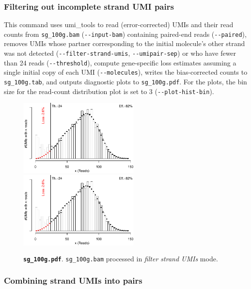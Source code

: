 \documentclass[10pt]{article}
\newcommand{\ddarg}[1]{\texttt{-{}-#1}}
\begin{document}
\subsubsection*{Filtering out incomplete strand UMI pairs}


This command uses umi\_tools to read (error-corrected) UMIs and their read counts from \texttt{sg\_100g.bam} (\ddarg{input-bam}) containing paired-end reads (\ddarg{paired}), removes UMIs whose partner corresponding to the initial molecule's other strand was not detected (\ddarg{filter-strand-umis}, \ddarg{umipair-sep}) or who have fewer than 24 reads (\ddarg{threshold}), compute gene-specific loss estimates assuming a single initial copy of each UMI (\ddarg{molecules}), writes the bias-corrected counts to \texttt{sg\_100g.tab}, and outputs diagnostic plots to \texttt{sg\_100g.pdf}. For the plots, the bin size for the read-count distribution plot is set to 3 (\ddarg{plot-hist-bin}).

\begin{figure}[H]
{\centering
\includegraphics[width=6cm,page=1]{../examples/sg_100g.pdf}
\includegraphics[width=6cm,page=2]{../examples/sg_100g.pdf}
\\}
\caption*{\textbf{\texttt{sg\_100g.pdf}}. \texttt{sg\_100g.bam} processed in \emph{filter strand UMIs} mode.}
\end{figure}

\newpage
\subsubsection*{Combining strand UMIs into pairs}

\end{document}
